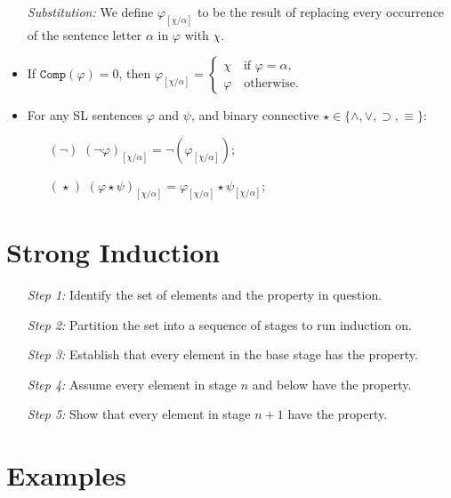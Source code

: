 \documentclass[a4paper, 11pt]{article} %
\newcommand{\set}[1]{\lbrace#1\rbrace} %
\newcommand{\comp}{\texttt{Comp}}
\begin{document}
\begin{itemize}
\begin{itemize}
    \end{itemize}
  \item[\it Substitution:] We define $\varphi_{[\chi/\alpha]}$ to be the result of replacing every occurrence of the sentence letter $\alpha$ in $\varphi$ with $\chi$.
      \item If $\comp(\varphi)=0$, then $\varphi_{[\chi/\alpha]}=
        \begin{cases}
          \chi \quad\text{if } \varphi=\alpha,\\
          \varphi \quad\text{otherwise.}
        \end{cases}$
      \item For any SL sentences $\varphi$ and $\psi$, and binary connective $\star\in\set{\wedge,\vee,\supset,\equiv}$: 
    \begin{itemize}
      \item[$(\neg)$] $(\neg\varphi)_{[\chi/\alpha]}=\neg(\varphi_{[\chi/\alpha]})$;
      \item[$(\hspace{1pt}\star\hspace{1pt})$] $(\varphi\star\psi)_{[\chi/\alpha]}=\varphi_{[\chi/\alpha]}\star\psi_{[\chi/\alpha]}$;
    \end{itemize}
\end{itemize}





\section*{Strong Induction}

\begin{enumerate}
  \item[\it Step 1:] Identify the set of elements and the property in question.
  \item[\it Step 2:] Partition the set into a sequence of stages to run induction on.
  \item[\it Step 3:] Establish that every element in the base stage has the property.
  \item[\it Step 4:] Assume every element in stage $n$ and below have the property. 
  \item[\it Step 5:] Show that every element in stage $n+1$ have the property. 
\end{enumerate}





\section*{Examples}
\end{document}
